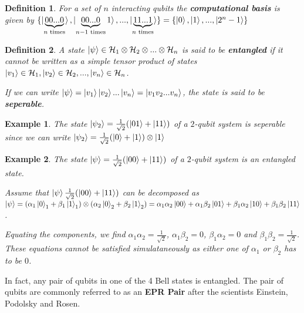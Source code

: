 \documentclass[12pt,twoside,fleqn]{report}
\theoremstyle{thmstyle}
\newtheorem{defn}{Definition}[chapter]
\newtheorem{eg}{Example}[chapter]
\begin{document}
\begin{defn}

    For a set of $n$ interacting qubits the \textbf{computational basis} is given by $\{ \ket{\underbrace{00...0}_{n \text{ times}}}, \ket{\underbrace{00...0}_{n-1 \text{ times}}1}, ... ,\ket{\underbrace{11...1}_{n \text{ times}}} \} = \{ \ket{0}, \ket{1}, ... , \ket{2^n - 1} \}$
\end{defn}




\begin{defn}
    A state $\ket{\psi} \in \mathcal{H}_1 \otimes \mathcal{H}_2 \otimes ... \otimes \mathcal{H}_n$ is said to be \textbf{entangled} if it cannot be written as a simple tensor product of states $\ket{v_1} \in \mathcal{H}_1, \ket{v_2} \in \mathcal{H}_2, ..., \ket{v_n} \in \mathcal{H}_n$. 

    If we can write $\ket{\psi} = \ket{v_1}\ket{v_2}...\ket{v_n} = \ket{v_1 v_2...v_n}$, the state is said to be \textbf{seperable}.
\end{defn}

\begin{eg}
The state $\ket{\psi_2} = \frac{1}{\sqrt{2}} (\ket{01} + \ket{11})$ of a $2$-qubit system is seperable since we can write $\ket{\psi_2} = \frac{1}{\sqrt{2}} (\ket{0} + \ket{1}) \otimes \ket{1}$
\end{eg}


\begin{eg}
The state $\ket{\psi} = \frac{1}{\sqrt{2}} (\ket{00} + \ket{11})$ of a $2$-qubit system is an entangled state.

    Assume that  $\ket{\psi} \frac{1}{\sqrt{2}} (\ket{00} + \ket{11}) $ can be decomposed as $\ket{\psi} = (\alpha_1 \ket{0}_1 + \beta_1 \ket{1}_1) \otimes (\alpha_2 \ket{0}_2 + \beta_2 \ket{1}_2) = \alpha_1 \alpha_2 \ket{00} + \alpha_1 \beta_2 \ket{01} + \beta_1 \alpha_2 \ket{10} + \beta_1 \beta_2 \ket{11}$.

    Equating the components, we find $\alpha_1 \alpha_2 = \displaystyle\frac{1}{\sqrt{2}}$, $\alpha_1 \beta_2 = 0$, $\beta_1 \alpha_2 = 0$ and $\beta_1 \beta_2 = \displaystyle\frac{1}{\sqrt{2}}$. These equations cannot be satisfied simulataneously as either one of $\alpha_1$ or $\beta_2$ has to be $0$.
\end{eg}

In fact, any pair of qubits in one of the 4 Bell states is entangled. The pair of qubits are commonly referred to as an \textbf{EPR Pair} after the scientists Einstein, Podolsky and Rosen.
\end{document}
